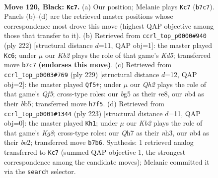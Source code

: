 \documentclass[11pt]{article}
\begin{document}
\clearpage

\begin{figure}[p]\centering
\begin{subfigure}{0.46\textwidth}\centering
\resizebox{\linewidth}{!}{%
\newchessgame
\chessboard[
  setfen={8/1k5q/8/6B1/1N6/K7/8/8 b - - 9 120},
  showmover=false,
  pgfstyle=straightmove, color=movearrow, markmove={b7-c7}
]}
\caption{}
\end{subfigure}\hfill
\begin{subfigure}{0.46\textwidth}\centering
\resizebox{\linewidth}{!}{%
\newchessgame
\chessboard[
  setfen={k7/8/8/1Q1K4/8/8/8/8 w - - 9 112},
  showmover=false,
  pgfstyle=straightmove, color=movearrow, markmove={d5-c6}
]}
\caption{}
\end{subfigure}
\\[4pt]
\begin{subfigure}{0.46\textwidth}\centering
\resizebox{\linewidth}{!}{%
\newchessgame
\chessboard[
  setfen={4R3/8/3k4/1B6/5q2/2N5/2K5/8 b - - 30 115},
  showmover=false,
  pgfstyle=straightmove, color=movearrow, markmove={f4-f5}
]}
\caption{}
\end{subfigure}\hfill
\begin{subfigure}{0.46\textwidth}\centering
\resizebox{\linewidth}{!}{%
\newchessgame
\chessboard[
  setfen={8/8/8/8/8/6KN/4B3/6k1 b - - 51 112},
  showmover=false,
  pgfstyle=straightmove, color=movearrow, markmove={g1-h1}
]}
\caption{}
\end{subfigure}
\caption{\textbf{Move 120, Black: \texttt{Kc7}.} (a) Our position; Melanie plays \texttt{Kc7} (\texttt{b7c7}). Panels (b)--(d) are the retrieved master positions whose correspondence most drove this move (highest QAP objective among those that transfer to it). (b) Retrieved from \texttt{ccrl\_top\_p0000\#940} (ply 222) [structural distance $d$=11, QAP obj=1]: the master played \texttt{Kc6}; under $\mu$ our \emph{Kb2} plays the role of that game's \emph{Kd5}; transferred move \texttt{b7c7} \textbf{(endorses this move)}. (c) Retrieved from \texttt{ccrl\_top\_p0003\#769} (ply 229) [structural distance $d$=12, QAP obj=2]: the master played \texttt{Qf5+}; under $\mu$ our \emph{Qh2} plays the role of that game's \emph{Qf5}; cross-type roles: our \emph{b}g5 as their \emph{r}e8, our \emph{n}b4 as their \emph{b}b5; transferred move \texttt{h7f5}. (d) Retrieved from \texttt{ccrl\_top\_p0001\#1344} (ply 223) [structural distance $d$=11, QAP obj=0]: the master played \texttt{Kh1}; under $\mu$ our \emph{Kb2} plays the role of that game's \emph{Kg8}; cross-type roles: our \emph{Q}h7 as their \emph{n}h3, our \emph{n}b4 as their \emph{b}e2; transferred move \texttt{b7b6}. Synthesis: 1 retrieved analog transferred to \texttt{Kc7} (summed QAP objective 1, the strongest correspondence among the candidate moves); Melanie committed it via the \texttt{search} selector.}
\label{fig:thought-m239}
\end{figure}
\end{document}
